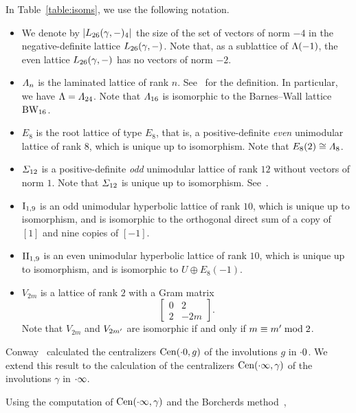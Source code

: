 \documentclass{amsart} %
\begin{document}
%
In Table~\ref{table:isoms}, we use the following notation.
\begin{itemize}
\item
We denote by $|L_{26}(\gamma, -)_4|$
the size of the set of vectors of norm $-4$ in the negative-definite lattice $L_{26}(\gamma, -)$.
Note that, as a sublattice of $\Lambda(-1)$, 
the even lattice $L_{26}(\gamma, -)$ has no vectors of norm $-2$.
\item 
$\varLambda_{n} $ is 
the laminated lattice of rank $n$. 
See~\cite[Chapter 6]{theCSbook} for the definition.
In particular, we have $\Lambda=\varLambda_{24}$.
Note that $\varLambda_{16}$ is isomorphic to the Barnes--Wall lattice $\mathrm{BW}_{16}$.
\item $E_8$ is the root lattice of type $E_8$, that is,
a positive-definite \emph{even} unimodular lattice of rank $8$,
which is unique up to isomorphism.
Note that $E_8(2)\cong \varLambda_{8}$.
\item $\varSigma_{12}$ is 
a positive-definite \emph{odd} unimodular lattice of rank $12$
without vectors of norm $1$.
Note that $\varSigma_{12}$ is unique up to isomorphism.
See~\cite[Table 16.7]{theCSbook}.
\item $\mathrm{I}_{1,9}$ is an odd unimodular hyperbolic lattice of rank $10$, 
which is unique up to isomorphism,
and is isomorphic to the orthogonal direct sum of
 a copy of $[1]$ and nine copies of $[-1]$.
 \item $\mathrm{II}_{1,9}$ is an even unimodular hyperbolic lattice of rank $10$,
 which is unique up to isomorphism,
 and is isomorphic to $U\oplus E_8(-1)$.
\item $V_{2m}$ is a lattice of rank $2$
with a Gram matrix 
%
\begin{equation}\label{eq:GramVm}
\left[\begin{array}{cc} 0&2 \\ 2 & -2m \end{array}\right].
\end{equation}
%
Note that $V_{2m}$ and $V_{2m^{\prime}}$ are isomorphic 
if and only if $m\equiv m^{\prime} \bmod 2$.
\end{itemize}
%
\par
\medskip
Conway~\cite[Chapter 10]{theCSbook} calculated the centralizers $\mathrm{Cen}(\cdot 0, g)$
of the involutions $g$ in $\cdot 0$.
We extend this result to the calculation of the centralizers $\mathrm{Cen}(\cdot \infty, \gamma)$
of the involutions $\gamma$ in $\cdot \infty$.
\par
Using the computation of $\mathrm{Cen}(\cdot \infty, \gamma)$
and the Borcherds method~\cite{MR913200, MR1654763},
\end{document}
